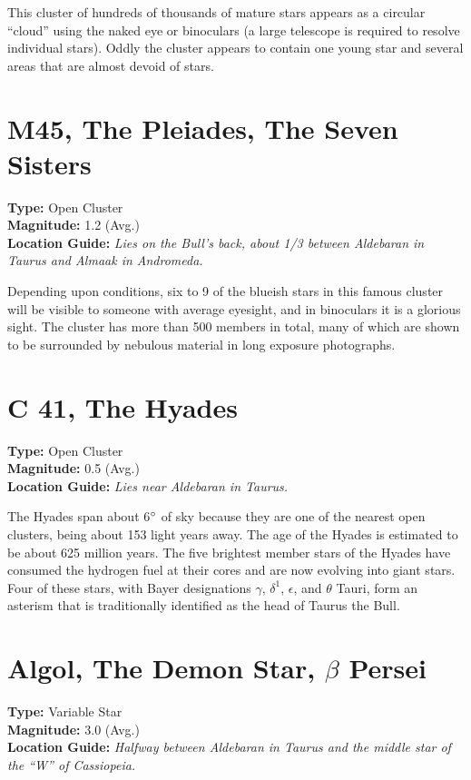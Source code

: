 This cluster of hundreds of thousands of mature stars appears as
a circular ``cloud'' using the naked eye or binoculars (a large
telescope is required to resolve individual stars). Oddly the cluster
appears to contain one young star and several areas that are almost
devoid of stars.

\section{M45, The Pleiades, The Seven Sisters}
\textbf{Type:} Open Cluster \\
\textbf{Magnitude:} 1.2 (Avg.) \\
\textbf{Location Guide:} \textit{Lies on the Bull's back, about 1/3 between Aldebaran in Taurus and Almaak in Andromeda.} 

Depending upon conditions, six to 9 of the blueish stars in this
famous cluster will be visible to someone with average eyesight, and in
binoculars it is a glorious sight. The cluster has more than 500
members in total, many of which are shown to be surrounded by nebulous
material in long exposure photographs.

\section{C 41, The Hyades}
\textbf{Type:} Open Cluster \\
\textbf{Magnitude:} 0.5 (Avg.) \\
\textbf{Location Guide:} \textit{Lies near Aldebaran in Taurus.} 

The Hyades span about 6$\degree$ of sky because they are one of the nearest open clusters, being about 153 light years away. The age of the Hyades is estimated to be about 625 million years. The five brightest member stars of the Hyades have consumed the hydrogen fuel at their cores and are now evolving into giant stars. Four of these stars, with Bayer designations $\gamma$, $\delta^1$, $\epsilon$, and $\theta$ Tauri, form an asterism that is traditionally identified as the head of Taurus the Bull.


\section{Algol, The Demon Star, \texorpdfstring{$\beta$}{beta} Persei}
\textbf{Type:} Variable Star \\
\textbf{Magnitude:} 3.0 (Avg.) \\
\textbf{Location Guide:} \textit{Halfway between Aldebaran in Taurus and the middle star of the ``W'' of Cassiopeia.}

